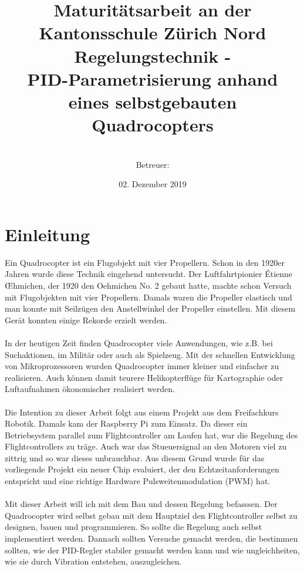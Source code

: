 \documentclass[12pt,a4paper, ngerman]{article}
\begin{document}
\title{\large Maturitätsarbeit an der Kantonsschule Zürich Nord \\ \Huge Regelungstechnik - \\ \huge PID-Parametrisierung anhand eines selbstgebauten Quadrocopters}
\author{ \\ Betreuer: }
\date{02. Dezember 2019}
\maketitle
{}

\newpage
\clearpage
{}
\tableofcontents
\newpage
{}

\section{Einleitung}
Ein Quadrocopter ist ein Flugobjekt mit vier Propellern. Schon in den 1920er Jahren wurde diese Technik eingehend untersucht. Der Luftfahrtpionier Étienne \OE hmichen, der 1920 den Oehmichen No. 2 gebaut hatte, machte schon Versuch mit Flugobjekten mit vier Propellern. Damals waren die Propeller elastisch und man konnte mit Seilzügen den Anstellwinkel der Propeller einstellen. Mit diesem Gerät konnten einige Rekorde erzielt werden\cite{website:Wikipedia_Quadrocopter}.\\ \\
In der heutigen Zeit finden Quadrocopter viele Anwendungen, wie z.B. bei Suchaktionen, im Militär oder auch als Spielzeug. Mit der schnellen Entwicklung von Mikroprozessoren wurden Quadrocopter immer kleiner und einfacher zu realisieren. Auch können damit teurere Helikopterflüge für Kartographie oder Luftaufnahmen ökonomischer realisiert werden\cite{website:Wikipedia_Quad_Einsatz}.\\ \\
Die Intention zu dieser Arbeit folgt aus einem Projekt aus dem Freifachkurs Robotik. Damals kam der Raspberry Pi zum Einsatz. Da dieser ein Betriebsystem parallel zum Flightcontroller am Laufen hat, war die Regelung des Flightcontrollers zu träge. Auch war das Stueuersignal an den Motoren viel zu zittrig und so war dieses unbrauchbar. Aus diesem Grund wurde für das vorliegende Projekt ein neuer Chip evaluiert, der den Echtzeitanforderungen entspricht und eine richtige Hardware Pulsweitenmodulation (PWM) hat. \\ \\
\iffalse
Mit dieser Arbeit will ich mit dem Bau und dessen Regelung befasssen. Der Quadrocopter wird selbst gebau mit dem Hauptziel den Flightcontroller selbst zu designen, bauen und programmieren. So sollte die Regelung auch selbst implementiert werden. Dannach sollten Versuche gemacht werden, die bestimmen sollten, wie der PID-Regler stabiler gemacht werden kann und wie ungleichheiten, wie sie durch Vibration entstehen, auszugleichen. 
\end{document}

